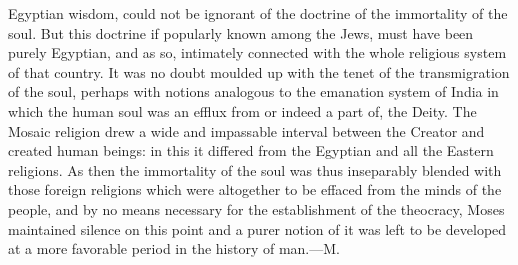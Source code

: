 {Egyptian wisdom, could not be ignorant of the doctrine of the
immortality of the soul. But this doctrine if popularly known
among the Jews, must have been purely Egyptian, and as so,
intimately connected with the whole religious system of that
country. It was no doubt moulded up with the tenet of the
transmigration of the soul, perhaps with notions analogous to the
emanation system of India in which the human soul was an efflux
from or indeed a part of, the Deity. The Mosaic religion drew a
wide and impassable interval between the Creator and created
human beings: in this it differed from the Egyptian and all the
Eastern religions. As then the immortality of the soul was thus
inseparably blended with those foreign religions which were
altogether to be effaced from the minds of the people, and by no
means necessary for the establishment of the theocracy, Moses
maintained silence on this point and a purer notion of it was
left to be developed at a more favorable period in the history of
man.—M.}



